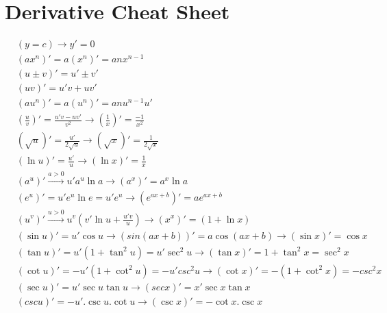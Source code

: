 \newpage
\section{Derivative Cheat Sheet}
\begin{multicols}{2}
\begin{align*}
&(y = c)\to y' = 0 \\
&(ax^n)' = a(x^n)' = anx^{n-1} \\
&(u \pm v)' = u' \pm v' \\
&(uv)' = u'v + uv' \\
&(au^n)' = a(u^n)' = anu^{n-1}u' \\
&(\frac{u}{v})' = \frac{u'v - uv'}{v^2} \to (\frac{1}{x})' = \frac{-1}{x^2} \\
&(\sqrt{u})' = \frac{u'}{2\sqrt{u}} \to (\sqrt{x})' = \frac{1}{2\sqrt{x}} \\
&(\ln u)' = \frac{u'}{u} \to (\ln x)' = \frac{1}{x}  \\
&(a^u)' \overset{a>0}{\longrightarrow} u'a^u\ln a \to (a^x)' = a^x\ln a \\
&(e^u)' = u'e^u\ln e = u'e^u \to (e^{ax+b})' = ae^{ax+b} \\
&(u^v)' \overset{u>0}{\longrightarrow} u^v(v'\ln u+\frac{u'v}{u}) \to (x^x)' = (1 + \ln x) \\
&(\sin u)' = u'\cos u \longrightarrow (sin(ax+b))' = a \cos(ax+b) \longrightarrow (\sin x)' = \cos x \\
&(\tan u)' = u'(1+\tan^2u) = u'\sec^2u \to (\tan x)' = 1+\tan^2 x = \sec^2 x \\
&(\cot u)' = -u'(1+\cot^2u) = -u'csc^2u \to (\cot x)' = -(1+\cot^2x) = -csc^2x \\
&(\sec u)' = u'\sec u \tan u \to (sec x)' = x'\sec x\tan x \\
& (csc u)' = -u'.\csc u.\cot u \to (\csc x)' = -\cot x.\csc x \\
\end{align*}

\end{multicols}